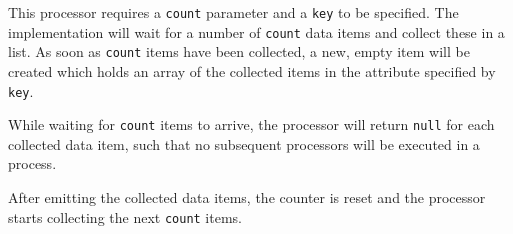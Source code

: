 
This processor requires a \texttt{count} parameter and a \texttt{key} to
be specified. The implementation will wait for a number of
\texttt{count} data items and collect these in a list. As soon as
\texttt{count} items have been collected, a new, empty item will be
created which holds an array of the collected items in the attribute
specified by \texttt{key}.

While waiting for \texttt{count} items to arrive, the processor will
return \texttt{null} for each collected data item, such that no
subsequent processors will be executed in a process.

After emitting the collected data items, the counter is reset and the
processor starts collecting the next \texttt{count} items.

\begin{table}[h]
\end{table}
